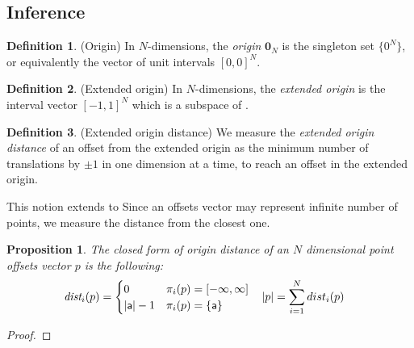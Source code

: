 \documentclass[acmlarge,review]{acmart}
\theoremstyle{definition}
\newtheorem{defn}{Definition}
\theoremstyle{plain}
\newtheorem{prop}{Proposition}
\theoremstyle{remark}
\begin{document}
\subsection{Inference}

\begin{defn}{(Origin)}
In $N$-dimensions, the \emph{origin} $\mathbf{0}_N$ is the singleton set
$\{0^N\}$, or equivalently the vector of unit intervals $[0, 0]^N$.
\end{defn}

\begin{defn}{(Extended origin)}
In $N$-dimensions, the \emph{extended origin} is the
interval vector $[-1, 1]^N$ which is a subspace of . 
\end{defn}

\begin{defn}{(Extended origin distance)}
  We measure the \emph{extended origin distance} of an offset from the
  extended origin as the minimum number of translations by $\pm 1$ in one
  dimension at a time, to reach an offset in the extended
  origin. 

This notion extends to Since an 
  offsets vector may represent infinite number of points, we measure the
  distance from the closest one.
\end{defn}
%
\begin{prop}{}
  The closed form of origin distance of an $N$ dimensional point offsets vector
  $p$ is the following:
%
  \begin{align*}
    \textit{dist}_i(p) & = \begin{cases}
      0 & \pi_i(p) = \interv{-\infty}{\infty}{} \\
      |\mathsf{a}| - 1 & \pi_i(p) = \{\mathsf{a}\} \\
    \end{cases} &
%
    |p| & = \sum_{i=1}^{N} dist_i(p)
  \end{align*}
\end{prop}
%
\begin{proof}
\end{proof}
\end{document}
